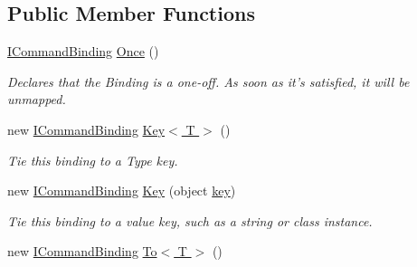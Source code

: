 \subsection*{Public Member Functions}
\begin{DoxyCompactItemize}
\item 
\hypertarget{interfacestrange_1_1extensions_1_1command_1_1api_1_1_i_command_binding_a83a6c902c38775b55ba74e75807cd603}{\hyperlink{interfacestrange_1_1extensions_1_1command_1_1api_1_1_i_command_binding}{I\-Command\-Binding} \hyperlink{interfacestrange_1_1extensions_1_1command_1_1api_1_1_i_command_binding_a83a6c902c38775b55ba74e75807cd603}{Once} ()}\label{interfacestrange_1_1extensions_1_1command_1_1api_1_1_i_command_binding_a83a6c902c38775b55ba74e75807cd603}

\begin{DoxyCompactList}\small\item\em Declares that the Binding is a one-\/off. As soon as it's satisfied, it will be unmapped. \end{DoxyCompactList}\item 
\hypertarget{interfacestrange_1_1extensions_1_1command_1_1api_1_1_i_command_binding_a0c4ce9b4f6175ba27d30a17ceda8741e}{new \hyperlink{interfacestrange_1_1extensions_1_1command_1_1api_1_1_i_command_binding}{I\-Command\-Binding} \hyperlink{interfacestrange_1_1extensions_1_1command_1_1api_1_1_i_command_binding_a0c4ce9b4f6175ba27d30a17ceda8741e}{Key$<$ T $>$} ()}\label{interfacestrange_1_1extensions_1_1command_1_1api_1_1_i_command_binding_a0c4ce9b4f6175ba27d30a17ceda8741e}

\begin{DoxyCompactList}\small\item\em Tie this binding to a Type key. \end{DoxyCompactList}\item 
\hypertarget{interfacestrange_1_1extensions_1_1command_1_1api_1_1_i_command_binding_a4cc2bc41f4c0c287f7e2e3ee52d659b8}{new \hyperlink{interfacestrange_1_1extensions_1_1command_1_1api_1_1_i_command_binding}{I\-Command\-Binding} \hyperlink{interfacestrange_1_1extensions_1_1command_1_1api_1_1_i_command_binding_a4cc2bc41f4c0c287f7e2e3ee52d659b8}{Key} (object \hyperlink{interfacestrange_1_1framework_1_1api_1_1_i_binding_acec8686208598f9f4a952ffd05449c4d}{key})}\label{interfacestrange_1_1extensions_1_1command_1_1api_1_1_i_command_binding_a4cc2bc41f4c0c287f7e2e3ee52d659b8}

\begin{DoxyCompactList}\small\item\em Tie this binding to a value key, such as a string or class instance. \end{DoxyCompactList}\item 
\hypertarget{interfacestrange_1_1extensions_1_1command_1_1api_1_1_i_command_binding_a777ffbebe4138283cae11d1e8e809e0e}{new \hyperlink{interfacestrange_1_1extensions_1_1command_1_1api_1_1_i_command_binding}{I\-Command\-Binding} \hyperlink{interfacestrange_1_1extensions_1_1command_1_1api_1_1_i_command_binding_a777ffbebe4138283cae11d1e8e809e0e}{To$<$ T $>$} ()}\label{interfacestrange_1_1extensions_1_1command_1_1api_1_1_i_command_binding_a777ffbebe4138283cae11d1e8e809e0e}


\end{DoxyCompactItemize}
